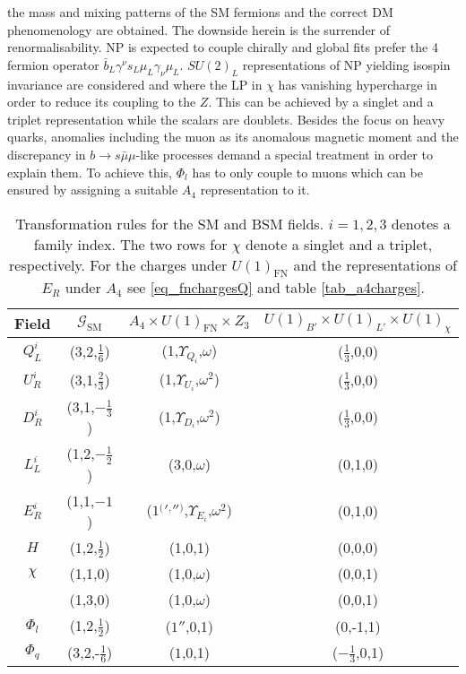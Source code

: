 the mass and mixing patterns of the SM fermions and the correct DM phenomenology are obtained. 
The downside herein is the surrender of renormalisability. NP is expected to couple chirally and global fits prefer the 4 fermion operator 
$\bar b_L \gamma^\nu s_L \mu_L \gamma_\nu \mu_L$. $SU(2)_L$ representations of NP yielding isospin invariance are considered and where the LP in
$\chi$ has vanishing hypercharge in order to reduce its coupling to the $Z$. This can be achieved by a singlet and a triplet representation while
the scalars are doublets.
Besides the focus on heavy quarks, anomalies including the muon as its anomalous magnetic moment and the discrepancy in  
$b\rightarrow s\bar\mu\mu$-like processes demand a special treatment in order to explain them.
To achieve this, $\Phi_l$ has to only couple to muons which can be ensured by assigning a suitable $A_4$ representation to it. 
\begin{table}[t]
 \begin{tabular}{c|c|c|c}
  Field & $\mathcal{G}_\text{SM}$ & $A_4 \times U(1)_\text{FN} \times Z_3$ & $U(1)_{B'}\times U(1)_{L'}\times U(1)_\chi$\\
  \hline
  $Q^i_L$ & (3,2,$\frac16$) & (1,$\Upsilon_{Q_i}$,$\omega$) & ($\frac13$,0,0)\\
  $U^i_R$ & (3,1,$\frac23$) & (1,$\Upsilon_{U_i}$,$\omega^2$)& ($\frac13$,0,0)\\
  $D^i_R$ & (3,1,$-\frac13$) & (1,$\Upsilon_{D_i}$,$\omega^2$)& ($\frac13$,0,0)\\
  $L^i_L$ & (1,2,$-\frac12$) & (3,0,$\omega$)& (0,1,0)\\
  $E^i_R$ & (1,1,$-1$) & ($1 {^(} {'} {^,} '' {^)} $,$\Upsilon_{E_i}$,$\omega^2$)& (0,1,0)\\
  $H$ & (1,2,$\frac12$) & (1,0,1)& (0,0,0)\\
  \hline
  $\chi$ & (1,1,0) & (1,0,$\omega$)& (0,0,1)\\ %
 & (1,3,0) & (1,0,$\omega$)&(0,0,1)\\
  $\Phi_l$ & (1,2,$\frac12$) & ($1''$,0,1)& (0,-1,1)\\
  $\Phi_q$ & (3,2,-$\frac16$) & ($1$,0,1)& ($-\frac13$,0,1)\\
 \end{tabular}
\caption{Transformation rules for the SM and BSM fields. $i=1,2,3$ denotes a family index. The two rows for $\chi$ denote a singlet and a triplet, respectively. For the charges under 
$U(1)_\text{FN}$ and the representations of $E_R$ under $A_4$ see \eqref{eq_fnchargesQ} and table \ref{tab_a4charges}.}
\label{tab_models}
\end{table}
